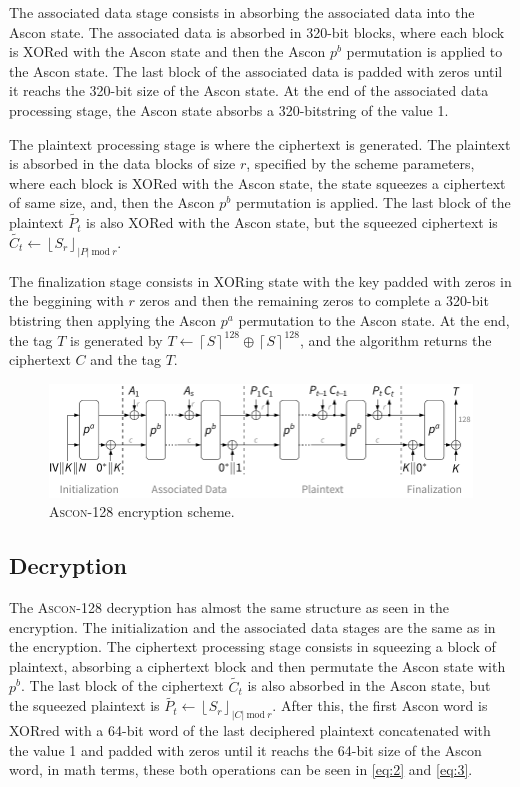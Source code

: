 \documentclass[11pt,twoside]{article}
\begin{document}
The associated data stage consists in absorbing the associated data into the Ascon state. The associated data is absorbed in 320-bit blocks, where each block is XORed with the Ascon state and then the Ascon $p^b$ permutation is applied to the Ascon state. The last block of the associated data is padded with zeros until it reachs the 320-bit size of the Ascon state. At the end of the associated data processing stage, the Ascon state absorbs a 320-bitstring of the value 1.

The plaintext processing stage is where the ciphertext is generated. The plaintext is absorbed in the data blocks of size $r$, specified by the scheme parameters, where each block is XORed with the Ascon state, the state squeezes a ciphertext of same size, and, then the Ascon $p^b$ permutation is applied. The last block of the plaintext $\tilde{P_t}$ is also XORed with the Ascon
state, but the squeezed ciphertext is $\tilde{C_t} \leftarrow {\left \lfloor  S_r \right \rfloor}_{|P| \ \textrm{mod} \ r}$.

The finalization stage consists in XORing state with the key padded with zeros in the beggining with $r$ zeros and then the remaining zeros to complete a 320-bit btistring then applying the Ascon $p^a$ permutation to the Ascon state. At the end, the tag $T$ is generated by $T \leftarrow {\left \lceil  S \right \rceil}^{128} \oplus  {\left \lceil  S \right \rceil}^{128}$, and the algorithm returns the ciphertext $C$ and the tag $T$.

\begin{figure}[h]
  \centering
  \includegraphics[scale=0.8]{assets/aead_encrypt.pdf}
  \caption{\textsc{Ascon-128} encryption scheme.}
  \label{fig:ascon128encrypt}
\end{figure}

\subsection{Decryption}

The \textsc{Ascon-128} decryption has almost the same structure as seen in the encryption. The initialization and the associated data stages are the same as in the encryption. The ciphertext processing stage consists in squeezing  a block of plaintext, absorbing a ciphertext block and then permutate the Ascon state with $p^b$. The last block of the ciphertext $\tilde{C_t}$ is also absorbed in the Ascon state, but the squeezed plaintext is $\tilde{P_t} \leftarrow {\left \lfloor  S_r \right \rfloor}_{|C| \ \textrm{mod} \ r}$. After this, the first Ascon word is XORred with a 64-bit word of the last deciphered plaintext concatenated with the value 1 and padded with zeros until it reachs the 64-bit size of the Ascon word, in math terms, these both operations can be seen in \cref{eq:2} and \cref{eq:3}.
\end{document}
